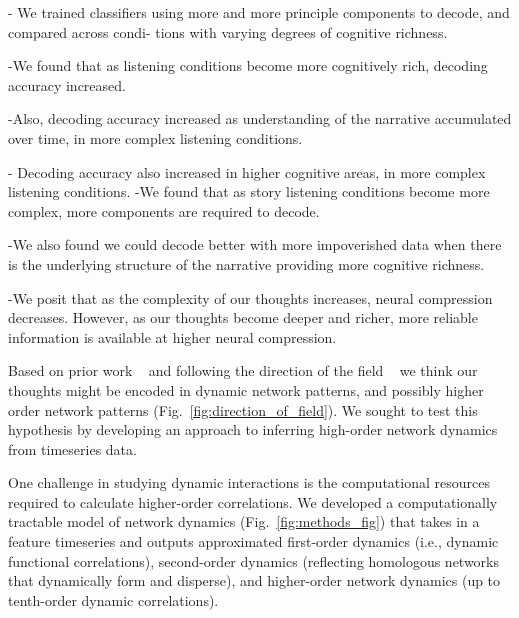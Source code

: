 

- We trained classifiers using more and more principle components to decode,
and compared across condi- tions with varying degrees of cognitive richness.

-We found that as listening conditions become more cognitively rich, decoding
accuracy increased.

-Also, decoding accuracy increased as understanding of the narrative
accumulated over time, in more complex listening conditions.

- Decoding accuracy also increased in higher cognitive areas, in more complex
listening conditions. -We found that as story listening conditions become more
complex, more components are required to decode.

-We also found we could decode better with more impoverished data when there is
the underlying structure of the narrative providing more cognitive richness.

-We posit that as the complexity of our thoughts increases, neural compression
decreases. However, as our thoughts become deeper and richer, more reliable
information is available at higher neural compression.







Based on prior work ~\citep{Deme19} and following the direction of the field
~\citep{Turk13} we think our thoughts might be encoded in dynamic network
patterns, and possibly higher order network patterns
(Fig.~\ref{fig:direction_of_field}). We sought to test this hypothesis by
developing an approach to inferring high-order network dynamics from timeseries
data.

One challenge in studying dynamic interactions is the computational resources
required to calculate higher-order correlations. We developed a computationally
tractable model of network dynamics (Fig.~\ref{fig:methods_fig}) that takes in
a feature timeseries and outputs approximated first-order dynamics (i.e.,
dynamic functional correlations), second-order dynamics (reflecting homologous
networks that dynamically form and disperse), and higher-order network dynamics
(up to tenth-order dynamic correlations).

